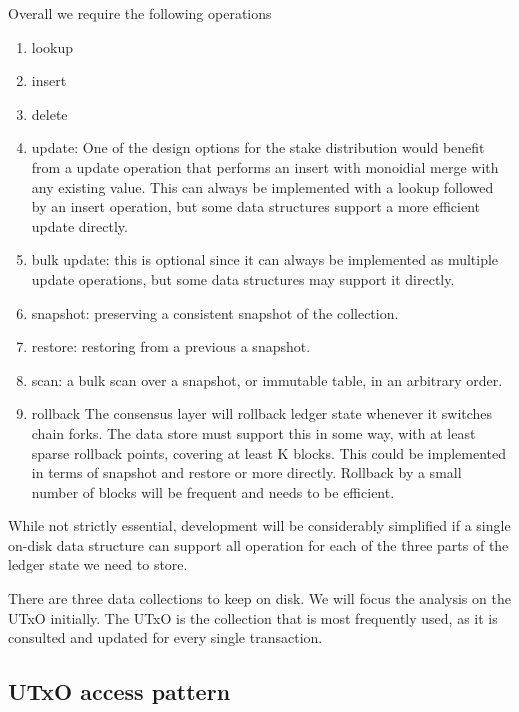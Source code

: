 \documentclass[11pt,a4paper]{article}
\begin{document}
Overall we require the following operations
\begin{enumerate}
  \item {\sc lookup}
  \item {\sc insert}
  \item {\sc delete}
  \item {\sc update}: One of the design options for the stake distribution
        would benefit from a update operation that performs an insert with
        monoidial merge with any existing value. This can always be implemented
        with a {\sc lookup} followed by an {\sc insert} operation, but some
        data structures support a more efficient {\sc update} directly.
  \item {\sc bulk update}: this is optional since it can always be implemented
        as multiple {\sc update} operations, but some data structures may
        support it directly.
  \item {\sc snapshot}: preserving a consistent snapshot of the collection.
  \item {\sc restore}: restoring from a previous a snapshot.
  \item {\sc scan}: a bulk scan over a snapshot, or immutable table, in an
        arbitrary order.
  \item {\sc rollback}
        \label{ROLLBACK}
        The consensus layer will rollback ledger state whenever it switches
        chain forks. The data store must support this in some way, with at
        least sparse rollback points, covering at least K blocks. This could
        be implemented in terms of {\sc snapshot} and {\sc restore} or more
        directly. Rollback by a small number of blocks will be frequent and
        needs to be efficient.
\end{enumerate}
While not strictly essential, development will be considerably simplified if
a single on-disk data structure can support all operation for each of the
three parts of the ledger state we need to store.

There are three data collections to keep on disk. We will focus the analysis on
the UTxO initially. The UTxO is the collection that is most frequently used, as
it is consulted and updated for every single transaction.

\subsection{UTxO access pattern}
\label{utxo-access-pattern}
\end{document}
